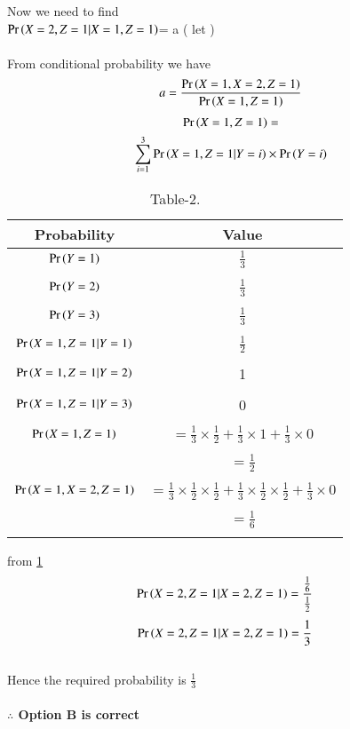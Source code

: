 \documentclass[journal,12pt,twocolumn]{IEEEtran}
\begin{document}
Now we need to find\\ $\Pr\left(X=2,Z=1|X=1,Z=1\right)$= a ( let )\\
\\From conditional probability we have
\begin{align}
    a=\frac{\Pr\left(X=1,X=2,Z=1\right)}{\Pr\left(X=1,Z=1\right)}
\end{align}
\begin{multline}
    \Pr\left(X=1,Z=1\right)=\\
    \sum_{i=1}^{3}\Pr\left(X=1,Z=1|Y=i\right)
    \times \Pr\left(Y=i\right)
\end{multline}
\newpage
\begin{table}[h!]
\resizebox{7cm}{!}
{
    \begin{tabular}{|c|c|}
         \hline
         Probability & Value\\
         \hline
         $\Pr\left(Y=1\right)$ & $\frac{1}{3}$\\&\\
         \hline
         $\Pr\left(Y=2\right)$ & $\frac{1}{3}$\\&\\
         \hline
         $\Pr\left(Y=3\right)$ & $\frac{1}{3}$\\&\\
         \hline
         $\Pr\left(X=1,Z=1|Y=1\right)$ & $\frac{1}{2}$ \\&\\
         \hline
         $\Pr\left(X=1,Z=1|Y=2\right)$ & 1\\&\\
         \hline
         $\Pr\left(X=1,Z=1|Y=3\right)$  & 0 \\&\\
         \hline
         $\Pr\left(X=1,Z=1\right)$ & $=\frac{1}{3}\times \frac{1}{2}+\frac{1}{3}\times 1+\frac{1}{3} \times 0$\\&\\ &$=\frac{1}{2}$\\&\\
         \hline
         $\Pr\left(X=1,X=2,Z=1\right)$ & $=\frac{1}{3}\times \frac{1}{2}\times \frac{1}{2}+\frac{1}{3}\times \frac{1}{2}\times \frac{1}{2}+\frac{1}{3}\times 0$\\&\\&$=\frac{1}{6}$\\&\\
         \hline
    \end{tabular}
    }
    \caption{\label{tab:Table-2}Table-2.}
\end{table}
from \ref{tab:Table-2} 
\begin{align}
\Pr\left(X=2,Z=1|X=2,Z=1\right)&=\frac{\frac{1}{6}}{\frac{1}{2}}
\end{align}
\begin{align}
\Pr\left(X=2,Z=1|X=2,Z=1\right)&=\frac{1}{3}
\end{align}
\\Hence the required probability is $\frac{1}{3}$\\
 \\ \textbf{$\therefore$ Option B is correct}
\end{document}

